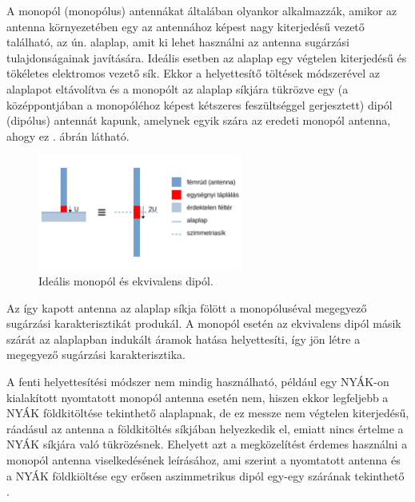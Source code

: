 \par A monopól (monopólus) antennákat általában olyankor alkalmazzák, amikor az antenna környezetében egy az antennához képest nagy kiterjedésű vezető található, az ún. alaplap, amit ki lehet használni az antenna sugárzási tulajdonságainak javítására. Ideális esetben az alaplap egy végtelen kiterjedésű és tökéletes elektromos vezető sík. Ekkor a helyettesítő töltések módszerével \cite{fodor} az alaplapot eltávolítva és a monopólt az alaplap síkjára tükrözve egy (a középpontjában a monopóléhoz képest kétszeres feszültséggel gerjesztett) dipól (dipólus) antennát kapunk, amelynek egyik szára az eredeti monopól antenna, ahogy ez . ábrán látható.
\begin{figure}[h]
	\centering
	\includegraphics[width=0.6\textwidth]{kep/monopol.pdf}
	\caption{Ideális monopól és ekvivalens dipól.}
	\label{fig:monopol}
\end{figure}
\par Az így kapott antenna az alaplap síkja fölött a monopóluséval megegyező sugárzási karakterisztikát produkál. A monopól esetén az ekvivalens dipól másik szárát az alaplapban indukált áramok hatása helyettesíti, így jön létre a megegyező sugárzási karakterisztika.
\par A fenti helyettesítési módszer nem mindig használható, például egy NYÁK-on kialakított nyomtatott monopól antenna esetén nem, hiszen ekkor legfeljebb a NYÁK földkitöltése tekinthető alaplapnak, de ez messze nem végtelen kiterjedésű, ráadásul az antenna a földkitöltés síkjában helyezkedik el, emiatt nincs értelme a NYÁK síkjára való tükrözésnek. Ehelyett azt a megközelítést érdemes használni a monopól antenna viselkedésének leírásához, ami szerint a nyomtatott antenna és a NYÁK földkiöltése egy erősen aszimmetrikus dipól egy-egy szárának tekinthető \cite{multi-band}.
